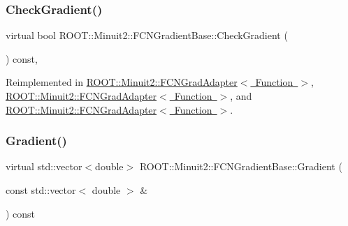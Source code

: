\subsubsection{\texorpdfstring{CheckGradient()}{CheckGradient()}\hspace{0.1cm}{\footnotesize\ttfamily [3/3]}}
{\footnotesize\ttfamily virtual bool R\+O\+O\+T\+::\+Minuit2\+::\+F\+C\+N\+Gradient\+Base\+::\+Check\+Gradient (\begin{DoxyParamCaption}{ }\end{DoxyParamCaption}) const\hspace{0.3cm}{\ttfamily [inline]}, {\ttfamily [virtual]}}



Reimplemented in \mbox{\hyperlink{classROOT_1_1Minuit2_1_1FCNGradAdapter_a10faf0c868284a440f291465b7efd08e}{R\+O\+O\+T\+::\+Minuit2\+::\+F\+C\+N\+Grad\+Adapter$<$ Function $>$}}, \mbox{\hyperlink{classROOT_1_1Minuit2_1_1FCNGradAdapter_a10faf0c868284a440f291465b7efd08e}{R\+O\+O\+T\+::\+Minuit2\+::\+F\+C\+N\+Grad\+Adapter$<$ Function $>$}}, and \mbox{\hyperlink{classROOT_1_1Minuit2_1_1FCNGradAdapter_a10faf0c868284a440f291465b7efd08e}{R\+O\+O\+T\+::\+Minuit2\+::\+F\+C\+N\+Grad\+Adapter$<$ Function $>$}}.

\mbox{\label{classROOT_1_1Minuit2_1_1FCNGradientBase_a004740e7e25a1358aafde6694196ef88}} 
\subsubsection{\texorpdfstring{Gradient()}{Gradient()}\hspace{0.1cm}{\footnotesize\ttfamily [1/3]}}
{\footnotesize\ttfamily virtual std\+::vector$<$double$>$ R\+O\+O\+T\+::\+Minuit2\+::\+F\+C\+N\+Gradient\+Base\+::\+Gradient (\begin{DoxyParamCaption}\item[{const std\+::vector$<$ double $>$ \&}]{ }\end{DoxyParamCaption}) const\hspace{0.3cm}{\ttfamily [pure virtual]}}



